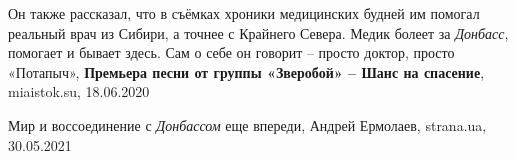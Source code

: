  
 
 
 
 

Он также рассказал, что в съёмках хроники медицинских будней им помогал
реальный врач из Сибири, а точнее с Крайнего Севера. Медик болеет за
\emph{Донбасс}, помогает и бывает здесь. Сам о себе он говорит – просто доктор,
просто «Потапыч», \textbf{Премьера песни от группы «Зверобой» – Шанс на
спасение}, miaistok.su, 18.06.2020

Мир и воссоединение с \emph{Донбассом} еще впереди, Андрей Ермолаев, strana.ua,
30.05.2021
